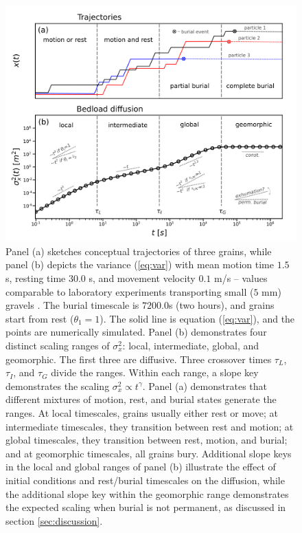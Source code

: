 \begin{figure}[!htbp]	
	\includegraphics[width=\linewidth,keepaspectratio]{./figures/ch4/diffusion.png}
	\caption{Panel (a) sketches conceptual trajectories of three grains, while panel (b) depicts the variance (\ref{eq:var}) with mean motion time $1.5$ s, resting time $30.0$ s, and movement velocity $0.1$ m/s -- values comparable to laboratory experiments transporting small ($5$ mm) gravels \citep{Lajeunesse2010,Martin2012}. The burial timescale is $7200.0$s (two hours), and grains start from rest ($\theta_1=1$). The solid line is equation (\ref{eq:var}), and the points are numerically simulated. Panel (b) demonstrates four distinct scaling ranges of $\sigma_x^2$: local, intermediate, global, and geomorphic. The first three are diffusive. Three crossover times $\tau_L$, $\tau_I$, and $\tau_G$ divide the ranges. Within each range, a slope key demonstrates the scaling $\sigma_x^2 \propto t^\gamma$. Panel (a) demonstrates that different mixtures of motion, rest, and burial states generate the ranges. At local timescales, grains usually either rest or move; at intermediate timescales, they transition between rest and motion; at global timescales, they transition between rest, motion, and burial; and at geomorphic timescales, all grains bury. Additional slope keys in the local and global ranges of panel (b) illustrate the effect of initial conditions and rest/burial timescales on the diffusion, while the additional slope key within the geomorphic range demonstrates the expected scaling when burial is not permanent, as discussed in section \ref{sec:discussion}.
	}
	\label{fig:diffvar}
\end{figure}

